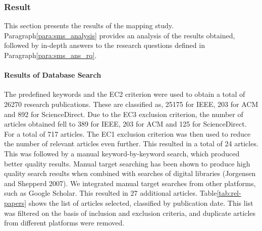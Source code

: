     
        \subsubsection{Result}
        This section presents the results of the mapping study. Paragraph\ref{para:sms_analysis} provides an analysis of the results obtained, followed by in-depth answers to the research questions defined in Paragraph\ref{para:sms_ans_rq}.

            \paragraph{Results of Database Search}
            The predefined keywords and the EC2 criterion were used to obtain a total of 26270 research publications. These are classified as, 25175 for IEEE, 203 for ACM and 892 for ScienceDirect. Due to the EC3 exclusion criterion, the number of articles obtained fell to 389 for IEEE, 203 for ACM and 125 for ScienceDirect. For a total of 717 articles. The EC1 exclusion criterion was then used to reduce the number of relevant articles even further. This resulted in a total of 24 articles.\\
            This was followed by a manual keyword-by-keyword search, which produced better quality results. Manual target searching has been shown to produce high quality search results when combined with searches of digital libraries (Jorgensen and Shepperd 2007). We integrated manual target searches from other platforms, such as Google Scholar. This resulted in 27 additional articles. Table\ref{tab:rel-papers} shows the list of articles selected, classified by publication date. This list was filtered on the basis of inclusion and exclusion criteria, and duplicate articles from different platforms were removed.\\

